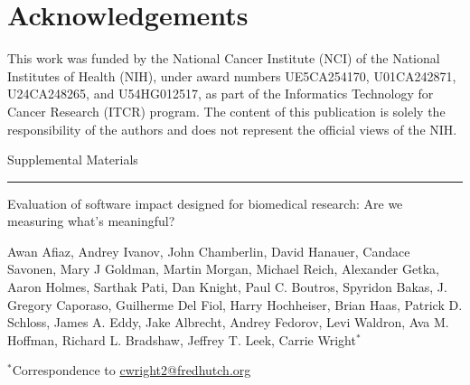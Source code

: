 \documentclass{article}
\begin{document}
\section{Acknowledgements}

This work was funded by the National Cancer Institute (NCI) of the National Institutes of Health (NIH), under award numbers UE5CA254170, U01CA242871, U24CA248265, and U54HG012517, as part of the Informatics Technology for Cancer Research (ITCR) program. The content of this publication is solely the responsibility of the authors and does not represent the official views of the NIH.



 
 




\clearpage
\onecolumn



{\huge Supplemental Materials}

\hrule

\vspace*{0.5cm}

\begin{center}

{\Large Evaluation of software impact designed for biomedical research: Are we measuring what's meaningful?}

\vspace*{0.75cm}

{\large Awan Afiaz,  Andrey Ivanov, John Chamberlin, David Hanauer, Candace Savonen, Mary J Goldman, Martin Morgan, Michael Reich,  Alexander Getka, Aaron Holmes, Sarthak Pati, Dan Knight,  Paul C. Boutros, Spyridon Bakas, J. Gregory Caporaso,  Guilherme Del Fiol, Harry Hochheiser, Brian Haas, Patrick D. Schloss, James A. Eddy, Jake Albrecht, Andrey Fedorov, Levi Waldron, Ava M. Hoffman, Richard L. Bradshaw, Jeffrey T. Leek, Carrie Wright$^*$}

\vspace*{0.3cm}

{\small $^*$Correspondence to \url{cwright2@fredhutch.org}}

\end{center}
\end{document}
